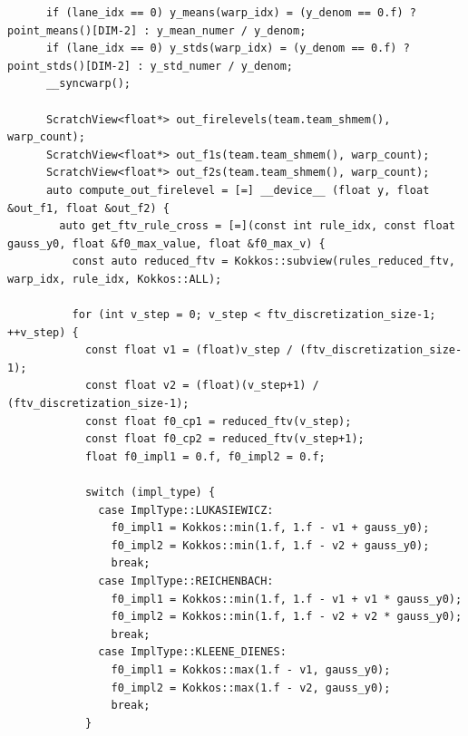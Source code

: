 \begin{verbatim}
      if (lane_idx == 0) y_means(warp_idx) = (y_denom == 0.f) ? point_means()[DIM-2] : y_mean_numer / y_denom;
      if (lane_idx == 0) y_stds(warp_idx) = (y_denom == 0.f) ? point_stds()[DIM-2] : y_std_numer / y_denom;
      __syncwarp();

      ScratchView<float*> out_firelevels(team.team_shmem(), warp_count);
      ScratchView<float*> out_f1s(team.team_shmem(), warp_count);
      ScratchView<float*> out_f2s(team.team_shmem(), warp_count);
      auto compute_out_firelevel = [=] __device__ (float y, float &out_f1, float &out_f2) {
        auto get_ftv_rule_cross = [=](const int rule_idx, const float gauss_y0, float &f0_max_value, float &f0_max_v) {
          const auto reduced_ftv = Kokkos::subview(rules_reduced_ftv, warp_idx, rule_idx, Kokkos::ALL);

          for (int v_step = 0; v_step < ftv_discretization_size-1; ++v_step) {
            const float v1 = (float)v_step / (ftv_discretization_size-1);
            const float v2 = (float)(v_step+1) / (ftv_discretization_size-1);
            const float f0_cp1 = reduced_ftv(v_step);
            const float f0_cp2 = reduced_ftv(v_step+1);
            float f0_impl1 = 0.f, f0_impl2 = 0.f;

            switch (impl_type) {
              case ImplType::LUKASIEWICZ:
                f0_impl1 = Kokkos::min(1.f, 1.f - v1 + gauss_y0);
                f0_impl2 = Kokkos::min(1.f, 1.f - v2 + gauss_y0);
                break;
              case ImplType::REICHENBACH:
                f0_impl1 = Kokkos::min(1.f, 1.f - v1 + v1 * gauss_y0);
                f0_impl2 = Kokkos::min(1.f, 1.f - v2 + v2 * gauss_y0);
                break;
              case ImplType::KLEENE_DIENES:
                f0_impl1 = Kokkos::max(1.f - v1, gauss_y0);
                f0_impl2 = Kokkos::max(1.f - v2, gauss_y0);
                break;
            }


\end{verbatim}
